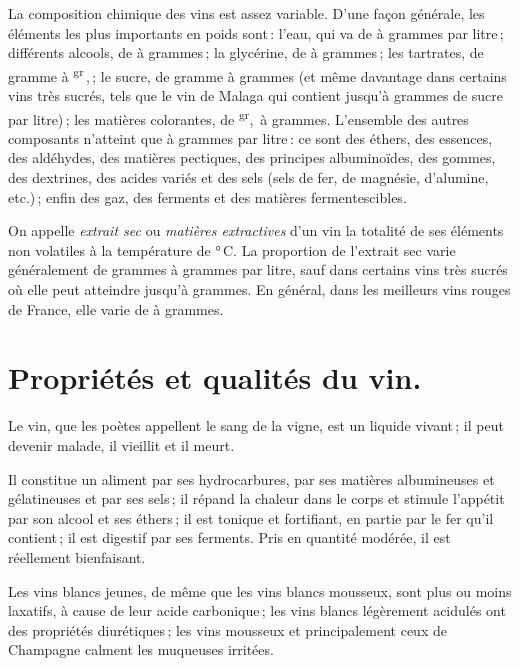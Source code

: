 La composition chimique des vins est assez variable. D'une façon générale, les
éléments les plus importants en poids sont : l'eau, qui va de {\mmm}
à {\mmm} grammes par litre ; différents alcools, de {\mmm}
à {\mmm} grammes ; la glycérine, de {\mmm} à {\mmm} grammes ;
les tartrates, de {\mmm} gramme
à {\mmm}\textsuperscript{gr} ,{\mmm} ; le sucre, de {\mmm}
gramme à {\mmm} grammes (et même davantage dans certains vins très sucrés,
tels que le vin de Malaga qui contient jusqu'à {\mmm} grammes de sucre
par litre) ; les matières colorantes, de
{\mmm}\textsuperscript{gr}, {\mmm} à {\mmm} grammes. L'ensemble
des autres composants n'atteint que {\mmm} à {\mmm} grammes par
litre : ce sont des éthers, des essences, des aldéhydes, des matières
pectiques, des principes albuminoïdes, des gommes, des dextrines, des acides
variés et des sels (sels de fer, de magnésie, d'alumine, etc.) ; enfin des gaz,
des ferments et des matières fermentescibles.

On appelle \textit{extrait sec} ou \textit{matières extractives} d'un vin la
totalité de ses éléments non volatiles à la température de {\mmm}° C. La
proportion de l'extrait sec varie généralement de {\mmm} grammes
à {\mmm} grammes par litre, sauf dans certains vins très sucrés où elle
peut atteindre jusqu'à {\mmm} grammes. En général, dans les meilleurs
vins rouges de France, elle varie de {\mmm} à {\mmm} grammes.

\section*{\centering Propriétés et qualités du vin.}

Le vin, que les poètes appellent le sang de la vigne, est un liquide vivant ; il
peut devenir malade, il vieillit et il meurt.

Il constitue un aliment par ses hydrocarbures, par ses matières albumineuses et
gélatineuses et par ses sels ; il répand la chaleur dans le corps et stimule
l'appétit par son alcool et ses éthers ; il est tonique et fortifiant, en
partie par le fer qu'il contient ; il est digestif par ses ferments. Pris en
quantité modérée, il est réellement bienfaisant.

Les vins blancs jeunes, de même que les vins blancs mousseux, sont plus ou
moins laxatifs, à cause de leur acide carbonique ; les vins blancs légèrement
acidulés ont des propriétés diurétiques ; les vins mousseux et principalement
ceux de Champagne calment les muqueuses irritées.

